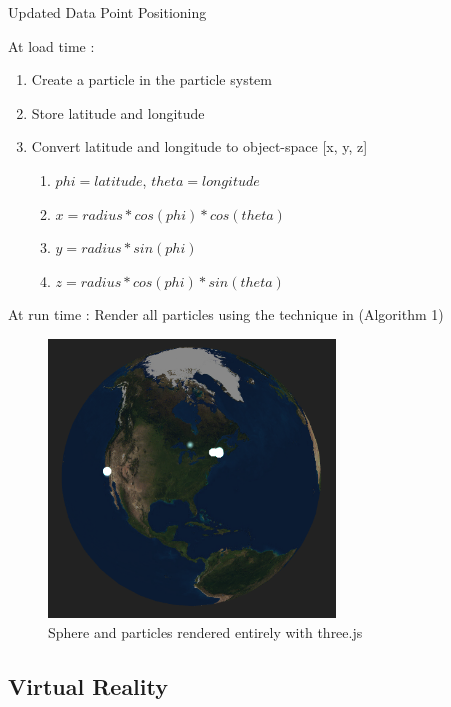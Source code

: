 \documentclass[conference]{acmsiggraph}
\begin{document}
\begin{algorithm}
\DontPrintSemicolon
\caption{Updated Data Point Positioning}
    At load time :  {
        \begin{enumerate}
            \item Create a particle in the particle system
            \item Store latitude and longitude
            \item Convert latitude and longitude to object-space [x, y, z]
                \begin{enumerate}
                    \item $phi = latitude$, $theta = longitude$
                    \item $x = radius * cos(phi) * cos(theta)$
                    \item $y = radius * sin(phi)$
                    \item $z = radius * cos(phi) * sin(theta)$
                \end{enumerate}
        \end{enumerate}
    }
    At run time :  {
        Render all particles using the technique in (Algorithm 1)
    }
\end{algorithm}

\begin{figure}
  \centering
  \includegraphics[width=3.0in]{images/threejs_sphere_earth}
  \caption{Sphere and particles rendered entirely with three.js}
\end{figure}

\subsection{Virtual Reality}
\end{document}
